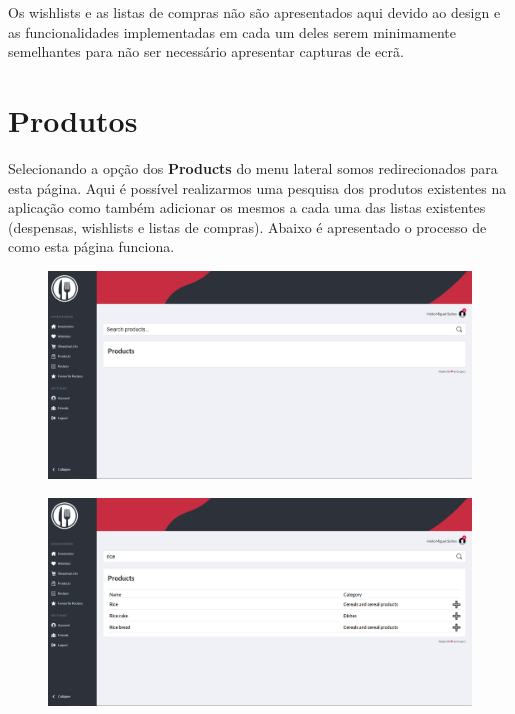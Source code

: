 \documentclass[a4paper]{report}
\begin{document}
    Os wishlists e as listas de compras não são apresentados aqui devido ao 
    design e as funcionalidades implementadas em cada um deles serem 
    minimamente semelhantes para não ser necessário apresentar capturas de 
    ecrã.

    \section{Produtos}

    Selecionando a opção dos \textbf{Products} do menu lateral somos
    redirecionados para esta página. Aqui é possível realizarmos uma 
    pesquisa dos produtos existentes na aplicação como também adicionar
    os mesmos a cada uma das listas existentes (despensas, wishlists e 
    listas de compras). Abaixo é apresentado o processo de como esta 
    página funciona.

    \begin{figure}[H]
        \centering
            \includegraphics[width=\textwidth]{images/produto_final/procura_de_produtos.png}
    \end{figure}

    \begin{figure}[H]
        \centering
            \includegraphics[width=\textwidth]{images/produto_final/procura_de_produtos_efetuada.png}
    \end{figure}
\end{document}

